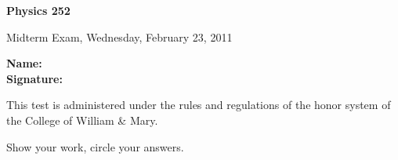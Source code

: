 \documentclass[letterpaper,addpoints,answers]{exam}
\begin{document}

\begin{coverpages}
	\noindent 
  \large\bfseries Physics 252

  \vspace{2ex}
	\noindent 
  Midterm Exam, Wednesday,  February  23, 2011

  \vspace{5ex}
	\noindent 
  \large\bfseries Name:\enspace\makebox[2in]{\hrulefill}\\

  \vspace{5ex}
	\noindent 
  \large\bfseries Signature:\enspace\makebox[2in]{\hrulefill}

  \vspace{5ex}
	\noindent 
	This test is administered under the rules and regulations of the honor 
	system of the College of William \& Mary.  

  \vspace{5ex}
	\noindent 
	Show your work, circle your answers.


  \vspace{5ex}
  \gradetable[v][questions]
\end{coverpages}
 
\end{document}

